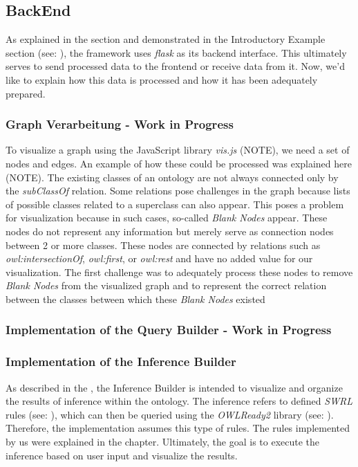 \subsection*{BackEnd}

As explained in the  section and demonstrated in the Introductory Example section (see: ), the framework uses \textit{flask} as its backend interface. 
This ultimately serves to send processed data to the frontend or receive data from it. Now, we'd like to explain how this data is processed and how it has been adequately prepared.
\subsubsection*{Graph Verarbeitung - Work in Progress}

To visualize a graph using the JavaScript library \textit{vis.js} (NOTE), we need a set of nodes and edges. An example of how these could be processed was explained here (NOTE). The existing classes of an ontology are not always connected only by the \textit{subClassOf} relation. Some relations pose challenges in the graph because lists of possible classes related to a superclass can also appear. This poses a problem for visualization because in such cases, so-called \textit{Blank Nodes} appear. These nodes do not represent any information but merely serve as connection nodes between 2 or more classes. These nodes are connected by relations such as \textit{owl:intersectionOf}, \textit{owl:first}, or \textit{owl:rest} and have no added value for our visualization. The first challenge was to adequately process these nodes to remove \textit{Blank Nodes} from the visualized graph and to represent the correct relation between the classes between which these \textit{Blank Nodes} existed

\subsubsection*{Implementation of the Query Builder - Work in Progress}


\subsubsection*{Implementation of the Inference Builder}
As described in the , the Inference Builder is intended to visualize and organize the results of inference within the ontology. 
The inference refers to defined \textit{SWRL} rules (see: ), which can then be queried using the \textit{OWLReady2} library (see: ).
Therefore, the implementation assumes this type of rules. The rules implemented by us were explained in the  chapter. 
Ultimately, the goal is to execute the inference based on user input and visualize the results.
